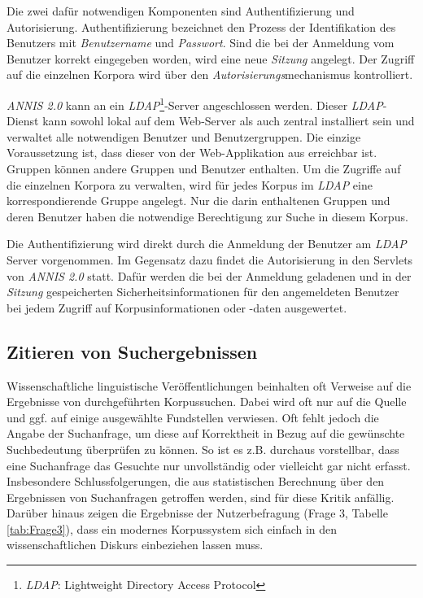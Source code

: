 Die zwei dafür notwendigen Komponenten sind Authentifizierung und Autorisierung. Authentifizierung bezeichnet den Prozess der Identifikation des Benutzers mit \emph{Benutzername} und \emph{Passwort}. Sind die bei der Anmeldung vom Benutzer korrekt eingegeben worden, wird eine neue \emph{Sitzung} angelegt. Der Zugriff auf die einzelnen Korpora wird über den \emph{Autorisierungs}mechanismus kontrolliert.

\emph{ANNIS 2.0} kann an ein \emph{LDAP}\footnote{\emph{LDAP}: Lightweight Directory Access Protocol}-Server angeschlossen werden. Dieser \emph{LDAP}-Dienst kann sowohl lokal auf dem Web-Server als auch zentral installiert sein und verwaltet alle notwendigen Benutzer und Benutzergruppen. Die einzige Voraussetzung ist, dass dieser von der Web-Applikation aus erreichbar ist. Gruppen können andere Gruppen und Benutzer enthalten. Um die Zugriffe auf die einzelnen Korpora zu verwalten, wird für jedes Korpus im \emph{LDAP} eine korrespondierende Gruppe angelegt. Nur die darin enthaltenen Gruppen und deren Benutzer haben die notwendige Berechtigung zur Suche in diesem Korpus.

Die Authentifizierung wird direkt durch die Anmeldung der Benutzer am \emph{LDAP} Server vorgenommen. Im Gegensatz dazu findet die Autorisierung in den Servlets von \emph{ANNIS 2.0} statt. Dafür werden die bei der Anmeldung geladenen und in der \emph{Sitzung} gespeicherten Sicherheitsinformationen für den angemeldeten Benutzer bei jedem Zugriff auf Korpusinformationen oder -daten ausgewertet.

\subsection{Zitieren von Suchergebnissen}\label{sec:Zitieren}

Wissenschaftliche linguistische Veröffentlichungen beinhalten oft Verweise auf die Ergebnisse von durchgeführten Korpussuchen. Dabei wird oft nur auf die Quelle und ggf. auf einige ausgewählte Fundstellen verwiesen. Oft fehlt jedoch die Angabe der Suchanfrage, um diese auf Korrektheit in Bezug auf die gewünschte Suchbedeutung überprüfen zu können. So ist es z.B. durchaus vorstellbar, dass eine Suchanfrage das Gesuchte nur unvollständig oder vielleicht gar nicht erfasst. Insbesondere Schlussfolgerungen, die aus statistischen Berechnung über den Ergebnissen von Suchanfragen getroffen werden, sind für diese Kritik anfällig. Darüber hinaus zeigen die Ergebnisse der Nutzerbefragung (Frage 3, Tabelle \ref{tab:Frage3}), dass ein modernes Korpussystem sich einfach in den wissenschaftlichen Diskurs einbeziehen lassen muss. 

